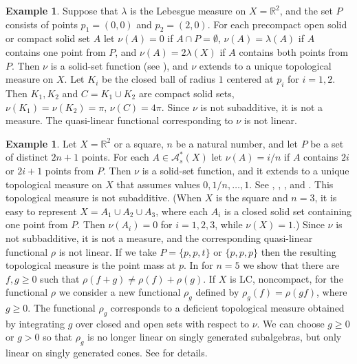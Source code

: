 \documentclass[sn-mathphys-num]{sn-jnl}%
\theoremstyle{thmstyleone}%
\theoremstyle{definition}
\newtheorem{example}[theorem]{Example}
\begin{document}
\begin{example} \label{ExDan2pt}
Suppose that  $ \lambda$ is the Lebesgue measure on $X = \mathbb{R}^2$,  and the set $P$ consists of points
$p_1 = (0,0)$ and $p_2 = (2,0)$.
For each precompact open solid or compact solid set $A$ let $ \nu(A) = 0$ if $A \cap P = \emptyset$,   
$ \nu(A) = \lambda(A) $ if $A$ contains one point from $P$, and 
$ \nu(A) = 2 \lambda(X)$ if $A$ contains both points from $P$.
Then $\nu$ is a solid-set function (see \cite[Ex. 15.5]{Butler:TMLCconstr}), and  $\nu$ extends to a unique topological measure on $X$. 
Let $K_i$ be the closed ball of radius $1$ centered at $p_i$ for $i=1,2$. Then 
$K_1, K_2$ and $ C= K_1 \cup K_2$ are compact solid sets, $\nu(K_1) = \nu(K_2) = \pi, \,  \nu(C) = 4 \pi$. Since 
$\nu$ is not subadditive, it is not a measure.  The quasi-linear functional corresponding to $ \nu$ is not linear. 
\end{example}

\begin{example} \label{nvssf}
Let  $X = \mathbb{R}^2$ or a square, $n$ be a natural number, and let $P$ be a set of distinct $2n+1$ points.
For each $A  \in \mathscr{A}_{s}^{*}(X)$ let $ \nu(A) = i/n$ if $ A$ contains  $2i$ or $2i+1$ points from $P$.
Then $ \nu$ is a solid-set function, and it extends to a unique topological measure on $X$ 
that assumes values $0, 1/n, \ldots, 1$. 
See  \cite[Ex. 2.1]{Aarnes:Pure},  \cite[Ex. 2.5]{AarnesRustad}, \cite[Ex. 4.14, 4.15]{QfunctionsEtm}, 
and \cite[Ex. 15.9]{Butler:TMLCconstr}.
This topological measure is not subadditive. 
(When $X$ is the square and $n=3$, it is easy to represent $X = A_1 \cup A_2 \cup A_3$,
where each $A_i$  is a closed solid set containing one point from $P$. Then $\nu(A_i) =0$ for $i=1,2,3$, while $\nu(X) = 1$.) 
Since $\nu$ is not subbadditive, it is not a measure, and the corresponding quasi-linear functional  $\rho$ is not linear. 
If we take $P =\{p, p, t \} $ or $ \{ p, p, p \}$ then the resulting topological measure is  
the point mass at $p$.
In \cite[Ex. 4.13]{Butler:QLFLC} for $n=5$ we show that there are $f,g \ge 0$ such that $ \rho(f+g) \neq \rho(f) + \rho(g)$. 
If $X$ is LC, noncompact, for the functional $\rho$ we consider
a new functional $ \rho_g$ defined by $\rho_g(f) = \rho(gf)$, where $g \ge 0$. 
The functional $\rho_g$ corresponds to a deficient topological measure 
obtained by integrating $g$ over closed and open sets with respect to $\nu$. We can choose $ g \ge 0$ or $ g >0$ so that  
$\rho_g$ is no longer linear on singly generated subalgebras, but only linear on singly generated cones. 
See \cite[Ex. 35, Th. 43]{Butler:Integration} for details.
\end{example}
\end{document}
